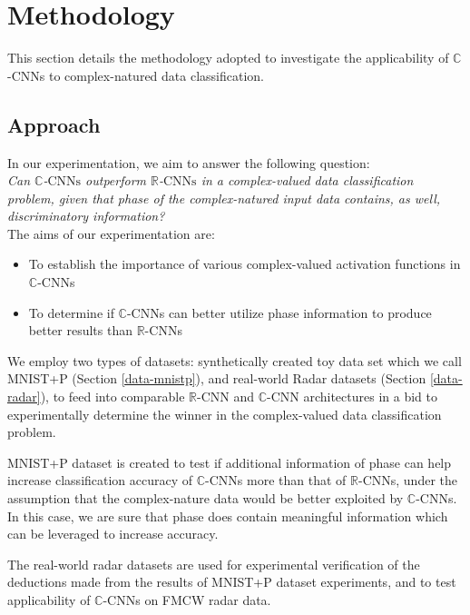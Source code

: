 \chapter{Methodology} \label{chap:methodology}
 
This section details the methodology adopted to investigate the applicability of $\mathbb{C}$-CNNs to complex-natured data classification. 

\section{Approach}

In our experimentation, we aim to answer the following question:\\
 
 \textit{Can $\mathbb{C}$-$\mathrm{CNNs}$ outperform $\mathbb{R}$-$\mathrm{CNNs}$ in a complex-valued data classification problem, given that phase of the complex-natured input data contains, as well, discriminatory information?}\\
 
 The aims of our experimentation are:
 \begin{itemize}
 	\item To establish the importance of various complex-valued activation functions in $\mathbb{C}$-CNNs
 	\item To determine if $\mathbb{C}$-CNNs can better utilize phase information to produce better results than $\mathbb{R}$-CNNs
 \end{itemize}
 
 
 We employ two types of datasets: synthetically created toy data set which we call MNIST+P (Section \ref{data-mnistp}), and real-world Radar datasets (Section \ref{data-radar}), to feed into comparable $\mathbb{R}$-CNN and $\mathbb{C}$-CNN architectures in a bid to experimentally determine the winner in the complex-valued data classification problem. 
 
 MNIST+P dataset is created to test if additional information of phase can help increase classification accuracy of $\mathbb{C}$-CNNs more than that of $\mathbb{R}$-CNNs, under the assumption that the complex-nature data would be better exploited by $\mathbb{C}$-CNNs. In this case, we are sure that phase does contain meaningful information which can be leveraged to increase accuracy. 
 
 The real-world radar datasets are used for experimental verification of the deductions made from the results of MNIST+P dataset experiments, and to test applicability of $\mathbb{C}$-CNNs on FMCW radar data. 
 
